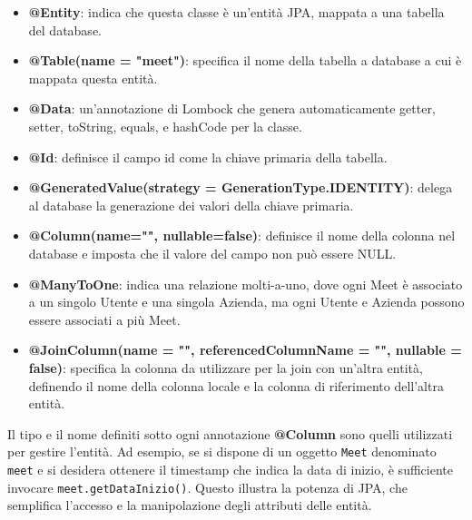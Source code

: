 \begin{itemize}
    \item \textbf{@Entity}: indica che questa classe è un'entità JPA, mappata a una tabella del database.
    \item \textbf{@Table(name = "meet")}: specifica il nome della tabella a database  a cui è mappata questa entità.
    \item \textbf{@Data}: un'annotazione di Lombock che genera automaticamente getter, setter, toString, equals, e hashCode per la classe.
    \item \textbf{@Id}: definisce il campo id come la chiave primaria della tabella.
    \item \textbf{@GeneratedValue(strategy = GenerationType.IDENTITY)}: delega al database la generazione dei valori della chiave primaria.
    \item \textbf{@Column(name="", nullable=false)}:  definisce il nome della colonna nel database e imposta che il valore del campo non può essere NULL.
    \item \textbf{@ManyToOne}: indica una relazione molti-a-uno, dove ogni Meet è associato a un singolo Utente e una singola Azienda,
    ma ogni Utente e Azienda possono essere associati a più Meet.
    \item \textbf{@JoinColumn(name = "", referencedColumnName = "", nullable = false)}:  specifica la colonna da utilizzare per la join 
    con un'altra entità, definendo il nome della colonna locale e la colonna di riferimento dell'altra entità.
\end{itemize}
Il tipo e il nome definiti sotto ogni annotazione \textbf{@Column} sono quelli utilizzati per gestire l'entità. 
Ad esempio, se si dispone di un oggetto \texttt{Meet} denominato \texttt{meet} e si desidera ottenere il timestamp che 
indica la data di inizio, è sufficiente invocare \texttt{meet.getDataInizio()}. 
Questo illustra la potenza di JPA, che semplifica l'accesso e la manipolazione degli attributi delle entità.
